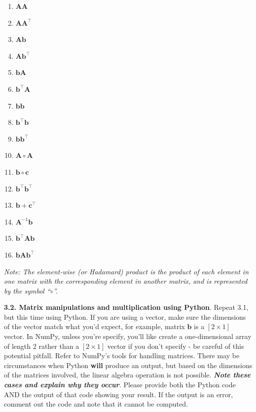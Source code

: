 \documentclass[
  letterpaper,
  DIV=11,
  numbers=noendperiod]{scrartcl}
\providecommand{\tightlist}{%
  \setlength{\itemsep}{0pt}\setlength{\parskip}{0pt}}\usepackage{longtable,booktabs,array}
\begin{document}
\begin{enumerate}
\def\labelenumi{\arabic{enumi}.}
\tightlist
\item
  \(\mathbf{A}\mathbf{A}\)
\item
  \(\mathbf{A}\mathbf{A}^{\top}\)
\item
  \(\mathbf{A}\mathbf{b}\)
\item
  \(\mathbf{A}\mathbf{b}^{\top}\)
\item
  \(\mathbf{b}\mathbf{A}\)
\item
  \(\mathbf{b}^{\top}\mathbf{A}\)
\item
  \(\mathbf{b}\mathbf{b}\)
\item
  \(\mathbf{b}^{\top}\mathbf{b}\)
\item
  \(\mathbf{b}\mathbf{b}^{\top}\)
\item
  \(\mathbf{A}\circ\mathbf{A}\)
\item
  \(\mathbf{b}\circ\mathbf{c}\)
\item
  \(\mathbf{b}^{\top}\mathbf{b}^{\top}\)
\item
  \(\mathbf{b} + \mathbf{c}^{\top}\)
\item
  \(\mathbf{A}^{-1}\mathbf{b}\)
\item
  \(\mathbf{b}^{{\top}}\mathbf{A}\mathbf{b}\)
\item
  \(\mathbf{b}\mathbf{A}\mathbf{b}^{{\top}}\)
\end{enumerate}

\emph{Note: The element-wise (or Hadamard) product is the product of
each element in one matrix with the corresponding element in another
matrix, and is represented by the symbol ``\(\circ\)''.}

\textbf{3.2. Matrix manipulations and multiplication using Python}.
Repeat 3.1, but this time using Python. If you are using a vector, make
sure the dimensions of the vector match what you'd expect, for example,
matrix \(\mathbf{b}\) is a \([2 \times 1]\) vector. In NumPy, unless
you're specify, you'll like create a one-dimensional array of length 2
rather than a \([2 \times 1]\) vector if you don't specify - be careful
of this potential pitfall. Refer to NumPy's tools for handling matrices.
There may be circumstances when Python \textbf{will} produce an output,
but based on the dimensions of the matrices involved, the linear algebra
operation is not possible. \textbf{\emph{Note these cases and explain
why they occur}}. Please provide both the Python code AND the output of
that code showing your result. If the output is an error, comment out
the code and note that it cannot be computed.
\end{document}
